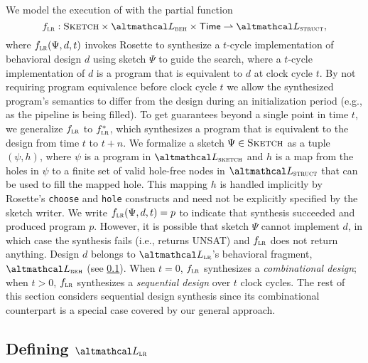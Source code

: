 We model the execution of \lr
  with the partial function
  \small
%
\[\lrfn: \Sketch \times \SpecLang \times \Time \rightharpoonup \ImplLang,\]
%
\normalsize
where $\text{$f_{\textsc{lr}}$}(\Psi, d, t)$
  invokes Rosette
  to synthesize a $t$-cycle
  implementation
  of behavioral design $d$ 
  using sketch $\Psi$ to guide
  the search,
  where a $t$-cycle
  implementation of $d$ is a program
  that is equivalent to $d$ at clock cycle
  $t$.
By not requiring program equivalence before
    clock cycle $t$ we allow the
    synthesized program's semantics to
    differ from the design during 
    an initialization period
    (e.g., as the pipeline is being filled).
To get guarantees beyond a single
    point in time $t$, we generalize
    $\text{$f_{\textsc{lr}}$}$ to $\text{$f_{\textsc{lr}}^{*}$}$,
    which synthesizes a program
    that is equivalent to the design
    from time $t$ to $t + n$.
We formalize a sketch $\Psi \in \textsc{Sketch}$  as a tuple
  $(\psi, h)$,
  where $\psi$ is a program in $\SketchLang$ 
  and $h$ is a map
  from the holes in $\psi$
  to a finite set of valid hole-free
  nodes in $\ImplLang$
  that can be used to fill
  the mapped hole.
This mapping $h$ is handled implicitly by Rosette's
  \texttt{choose} and \texttt{hole} constructs and
  need not be explicitly specified by the
  sketch writer.
We write $\text{$f_{\textsc{lr}}$}(\Psi, d, t) = p$ to 
    indicate that synthesis succeeded and produced
    \lr{} program $p$.
However, it is possible that sketch $\Psi$
    cannot implement $d$, in which case
    the synthesis fails
    (i.e., returns UNSAT)
    and
    $\text{$f_{\textsc{lr}}$}$ does not return anything.
Design $d$ belongs to 
  $\UberLang$'s behavioral fragment,
  $\SpecLang$ (see
  \cref{subsec:lrir-syntax-and-semantics}).
%
When $t = 0$, $\text{$f_{\textsc{lr}}$}$ 
  synthesizes a 
  \textit{combinational design}; when 
$t > 0$, $\text{$f_{\textsc{lr}}$}$ 
  synthesizes a \textit{sequential design}
  over $t$ clock cycles.
The rest of this section 
  considers sequential design synthesis 
  since its combinational counterpart is 
  a special case covered
  by our general approach.
  
  
\subsection{Defining $\UberLang$}
\label{subsec:lrir-syntax-and-semantics}

